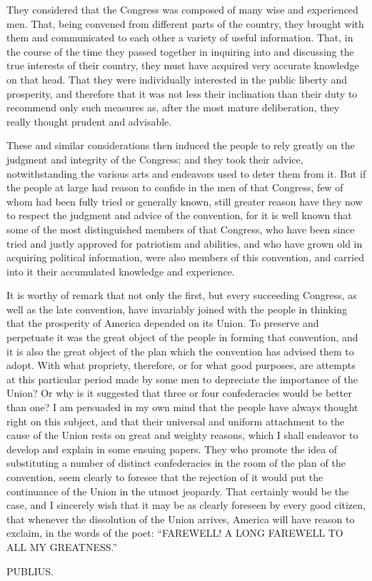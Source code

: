 They considered that the Congress was composed of many wise and
experienced men. That, being convened from different parts of the
country, they brought with them and communicated to each other a
variety of useful information. That, in the course of the time they
passed together in inquiring into and discussing the true interests
of their country, they must have acquired very accurate knowledge on
that head. That they were individually interested in the public
liberty and prosperity, and therefore that it was not less their
inclination than their duty to recommend only such measures as,
after the most mature deliberation, they really thought prudent and
advisable.

These and similar considerations then induced the people to rely
greatly on the judgment and integrity of the Congress; and they
took their advice, notwithstanding the various arts and endeavors
used to deter them from it. But if the people at large had reason
to confide in the men of that Congress, few of whom had been fully
tried or generally known, still greater reason have they now to
respect the judgment and advice of the convention, for it is well
known that some of the most distinguished members of that Congress,
who have been since tried and justly approved for patriotism and
abilities, and who have grown old in acquiring political
information, were also members of this convention, and carried into
it their accumulated knowledge and experience.

It is worthy of remark that not only the first, but every
succeeding Congress, as well as the late convention, have invariably
joined with the people in thinking that the prosperity of America
depended on its Union. To preserve and perpetuate it was the great
object of the people in forming that convention, and it is also the
great object of the plan which the convention has advised them to
adopt. With what propriety, therefore, or for what good purposes,
are attempts at this particular period made by some men to
depreciate the importance of the Union? Or why is it suggested that
three or four confederacies would be better than one? I am
persuaded in my own mind that the people have always thought right
on this subject, and that their universal and uniform attachment to
the cause of the Union rests on great and weighty reasons, which I
shall endeavor to develop and explain in some ensuing papers. They
who promote the idea of substituting a number of distinct
confederacies in the room of the plan of the convention, seem
clearly to foresee that the rejection of it would put the
continuance of the Union in the utmost jeopardy. That certainly
would be the case, and I sincerely wish that it may be as clearly
foreseen by every good citizen, that whenever the dissolution of the
Union arrives, America will have reason to exclaim, in the words of
the poet: ``FAREWELL! A LONG FAREWELL TO ALL MY GREATNESS.''

PUBLIUS.


